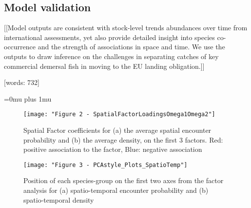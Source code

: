 \documentclass{nature}
\begin{document}
\begin{linenumbers}
\subsection{Model validation}


[[Model outputs are consistent with stock-level trends abundances over time
from international assessments, yet also provide detailed insight into species
co-occurrence and the strength of associations in space and time.  We use the
outputs to draw inference on the challenges in separating catches of key
commercial demersal fish in moving to the EU landing obligation.]]

[words: 732]

\end{linenumbers}
\newpage
\Urlmuskip=0mu plus 1mu\relax

\small{}






\begin{figure}
\begin{center}
	\texttt{[image: "Figure 2 - SpatialFactorLoadingsOmega1Omega2"]}
	\label{fig:1}
	\caption{Spatial Factor coefficients for (a) the average spatial encounter
		probability and (b) the average density,  on the first 3
		factors. Red: positive association to the factor, Blue:
		negative association}
\end{center}
\end{figure}


\begin{figure}
\begin{center}
	\texttt{[image: "Figure 3 - PCAstyle\_Plots\_SpatioTemp"]}
	\label{fig:2}
	\caption{Position of each species-group on the first two axes from the
		factor analysis for (a) spatio-temporal encounter probability
		and (b) spatio-temporal density}
\end{center}
\end{figure}
\end{document}
